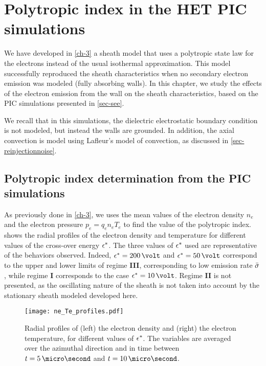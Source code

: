 

\section{Polytropic index in the \ac{HET} \ac{PIC} simulations}
\label{sec-PIC_poly}

We have developed in \cref{ch-3} a sheath model that uses a polytropic state law for the electrons instead of the usual isothermal approximation.
This model successfully reproduced the sheath characteristics  when no secondary electron emission was modeled (fully absorbing walls).
In this chapter, we study the effects of the electron emission from the wall on the sheath characteristics, based on the \ac{PIC} simulations presented in \cref{sec-see}.

We recall that in this simulations, the dielectric electrostatic boundary condition is not modeled, but instead the walls are grounded.
In addition, the axial convection is model using Lafleur's model of convection, as discussed in \cref{sec-reinjectionnoise}.

\subsection{Polytropic index determination from the PIC simulations} \label{subsec-fluid_see_polyfit}

As previously done in \cref{ch-3}, we uses the mean values of the electron density $n_e$ and the electron pressure $ p_e = q_e n_e T_e$ to find the value of the polytropic index.
 shows the radial profiles of the electron density and temperature for different values of the cross-over energy $\epsilon^{*}$.
The three values of $\epsilon^{*}$ used are representative of the behaviors observed.
Indeed, $\crover=200\,\volt$ and $\crover=50\,\volt$ correspond to the upper and lower limits of regime {\bf III}, corresponding to low emission rate $ \bar{\sigma }$, while regime {\bf I} corresponds to the case $\crover=10\,\volt$.
Regime {\bf II} is not presented, as the oscillating nature of the sheath is not taken into account by the stationary sheath modeled developed here. 


\begin{figure}[hbtp]
  \centering
  \texttt{[image: ne\_Te\_profiles.pdf]}
  \caption{Radial profiles of (left) the electron density and (right) the electron temperature, for different values of $\epsilon^{*}$. The variables are averaged over the azimuthal direction and in time between $t=5\,\micro\second$ and $t=10\,\micro\second$.  }
  \label{fig-radial_profiles_see}
\end{figure}

